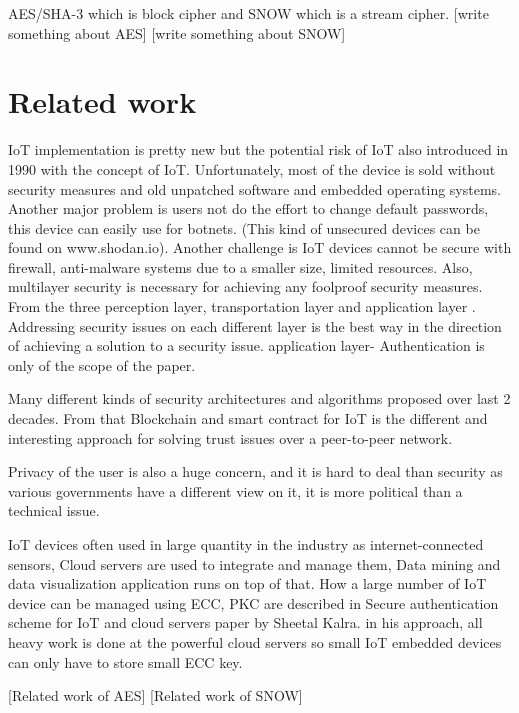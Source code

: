 \documentclass[preprint,10pt,5p]{elsarticle}
\begin{document}
AES/SHA-3  which is block cipher and SNOW which is a stream cipher. [write something about AES] [write something about SNOW]


\section{Related work}
IoT implementation is pretty new but the potential risk of IoT also introduced in 1990 with the concept of IoT.\cite{7165580} Unfortunately, most of the device is sold without security measures and old unpatched software and embedded operating systems. Another major problem is users not do the effort to change default passwords,  this device can easily use for botnets. (This kind of unsecured devices can be found on www.shodan.io). Another challenge is IoT devices cannot be secure with firewall, anti-malware systems due to a smaller size, limited resources. Also, multilayer security is necessary for achieving any foolproof security measures. From the three perception layer, transportation layer and application layer \cite{Yang2012}. 
Addressing security issues on each different layer is the best way in the direction of achieving a solution to a security issue. \cite{Jing2014} application layer- Authentication is only of the scope of the paper.  

Many different kinds of security architectures and algorithms proposed over last 2 decades. From that Blockchain and smart contract for IoT is the different and interesting approach for solving trust issues over a peer-to-peer network.\cite{christidis2016blockchains}

Privacy of the user is also a huge concern, and it is hard to deal than security as various governments have a different view on it, it is more political than a technical issue.\cite{Weber2010}

IoT devices often used in large quantity in the industry as internet-connected sensors, Cloud servers are used to integrate and manage them, Data mining and data visualization application runs on top of that.  How a large number of IoT device can be managed using ECC, PKC are described in Secure authentication scheme for IoT and cloud servers paper by Sheetal Kalra. in his approach, all heavy work is done at the powerful cloud servers so small IoT embedded devices can only have to store small ECC key. \cite{Kalra2015}

[Related work of AES]
[Related work of SNOW]


\end{document}
